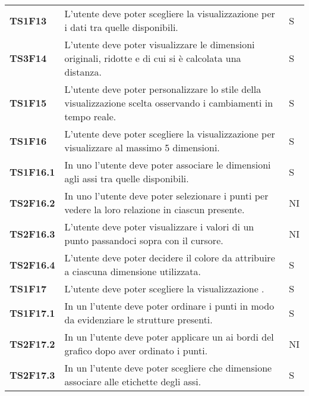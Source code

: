 {\begin{longtable}{ C{2cm} | C{12cm}| C{1.5cm} }
\textbf{TS1F13} & 
L'utente deve poter scegliere la visualizzazione per i dati tra quelle disponibili. & 
S\\

\textbf{TS3F14} & 
L'utente deve poter visualizzare le dimensioni originali, ridotte e di cui si è calcolata una distanza. & 
S\\

\textbf{TS1F15} & 
L'utente deve poter personalizzare lo stile della visualizzazione scelta osservando i cambiamenti in tempo reale. & 
S\\

\textbf{TS1F16} & 
L'utente deve poter scegliere la visualizzazione  per visualizzare  al massimo 5 dimensioni. & 
S\\

\textbf{TS1F16.1} & 
In uno  l'utente deve poter associare le dimensioni agli assi tra quelle disponibili. & 
S\\

\textbf{TS2F16.2} & 
In uno  l'utente deve poter selezionare i punti per vedere la loro relazione in ciascun  presente. & 
NI\\

\textbf{TS2F16.3} & 
L'utente deve poter visualizzare i valori di un punto passandoci sopra con il cursore. & 
NI\\

\textbf{TS2F16.4} & 
L'utente deve poter decidere il colore da attribuire a ciascuna dimensione utilizzata. & 
S\\

\textbf{TS1F17} & 
L'utente deve poter scegliere la visualizzazione . & 
S\\

\textbf{TS1F17.1} & 
In un  l'utente deve poter ordinare i punti in modo da evidenziare le strutture presenti. & 
S\\

\textbf{TS2F17.2} & 
In un  l'utente deve poter applicare un  ai bordi del grafico dopo aver ordinato i punti. & 
NI\\

\textbf{TS2F17.3} & 
In un  l'utente deve poter scegliere che dimensione associare alle etichette degli assi. & 
S\\


\end{longtable}}
